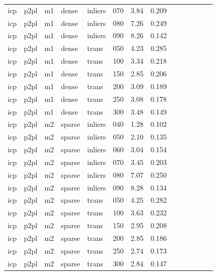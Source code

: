 \begin{table}[htbp]
\begin{tabular}{llllllrrrrrrrr}
  icp & p2pl & m1 & dense & inliers & 070 & 3.84 & 0.209 \\
  icp & p2pl & m1 & dense & inliers & 080 & 7.26 & 0.249 \\
  icp & p2pl & m1 & dense & inliers & 090 & 8.26 & 0.142 \\
  icp & p2pl & m1 & dense & trans & 050 & 4.23 & 0.285 \\
  icp & p2pl & m1 & dense & trans & 100 & 3.34 & 0.218 \\
  icp & p2pl & m1 & dense & trans & 150 & 2.85 & 0.206 \\
  icp & p2pl & m1 & dense & trans & 200 & 3.09 & 0.189 \\
  icp & p2pl & m1 & dense & trans & 250 & 3.08 & 0.178 \\
  icp & p2pl & m1 & dense & trans & 300 & 3.48 & 0.149 \\
  icp & p2pl & m2 & sparse & inliers & 040 & 1.28 & 0.102 \\
  icp & p2pl & m2 & sparse & inliers & 050 & 2.10 & 0.135 \\
  icp & p2pl & m2 & sparse & inliers & 060 & 3.04 & 0.154 \\
  icp & p2pl & m2 & sparse & inliers & 070 & 3.45 & 0.203 \\
  icp & p2pl & m2 & sparse & inliers & 080 & 7.07 & 0.250 \\
  icp & p2pl & m2 & sparse & inliers & 090 & 8.28 & 0.134 \\
  icp & p2pl & m2 & sparse & trans & 050 & 4.25 & 0.282 \\
  icp & p2pl & m2 & sparse & trans & 100 & 3.63 & 0.232 \\
  icp & p2pl & m2 & sparse & trans & 150 & 2.95 & 0.208 \\
  icp & p2pl & m2 & sparse & trans & 200 & 2.85 & 0.186 \\
  icp & p2pl & m2 & sparse & trans & 250 & 2.74 & 0.173 \\
  icp & p2pl & m2 & sparse & trans & 300 & 2.84 & 0.147 \\
\bottomrule
\end{tabular}
\end{table}
